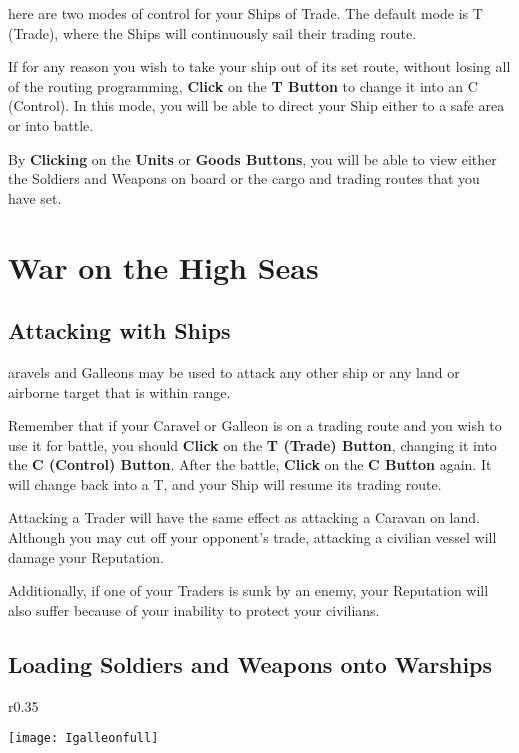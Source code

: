 here are two modes of control for your Ships of Trade. The default mode is T (Trade), where the Ships will continuously sail their trading route.

If for any reason you wish to take your ship out of its set route, without losing all of the routing programming, \textbf{Click} on the \textbf{T Button} to change it into an C (Control). In this mode, you will be able to direct your Ship either to a safe area or into battle.

By \textbf{Clicking} on the \textbf{Units} or \textbf{Goods Buttons}, you will be able to view either the Soldiers and Weapons on board or the cargo and trading routes that you have set.

\section{{War on the High Seas}}


\subsection{{Attacking with Ships}}

aravels and Galleons may be used to attack any other ship or any land or airborne target that is within range.

Remember that if your Caravel or Galleon is on a trading route and you wish to use it for battle, you should \textbf{Click} on the \textbf{T (Trade) Button}, changing it into the \textbf{C (Control) Button}. After the battle, \textbf{Click} on the \textbf{C Button} again. It will change back into a T, and your Ship will resume its trading route.

Attacking a Trader will have the same effect as attacking a Caravan on land. Although you may cut off your opponent’s trade, attacking a civilian vessel will damage your Reputation.

Additionally, if one of your Traders is sunk by an enemy, your Reputation will also suffer because of your inability to protect your civilians.

\subsection{{Loading Soldiers and Weapons onto Warships}}

\begin{wrapfigure}{r}{0.35\textwidth}
    \vspace{-20pt}
    \begin{center}
        \texttt{[image: Igalleonfull]} %
    \end{center}
    \vspace{-10pt} %
\end{wrapfigure}

